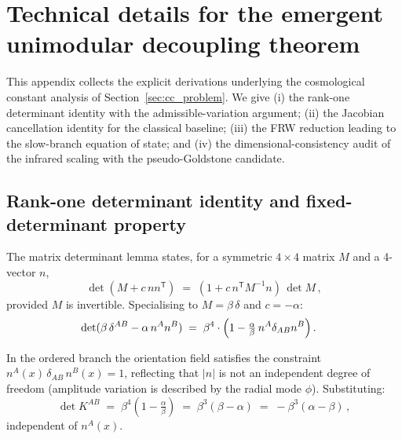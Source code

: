 
\section{Technical details for the emergent unimodular decoupling
theorem}
\label{app:cc_technical}

This appendix collects the explicit derivations underlying the
cosmological constant analysis of Section~\ref{sec:cc_problem}. We
give (i) the rank-one determinant identity with the admissible-variation
argument; (ii) the Jacobian cancellation identity for the classical
baseline; (iii) the FRW reduction leading to the slow-branch equation
of state; and (iv) the dimensional-consistency audit of the infrared
scaling with the pseudo-Goldstone candidate.


\subsection{Rank-one determinant identity and fixed-determinant
property}
\label{app:rank1}

The matrix determinant lemma states, for a symmetric $4\times 4$
matrix $M$ and a 4-vector $n$,
\begin{equation}
\det(M + c\,n n^{\mathsf T})
\;=\; (1 + c\,n^{\mathsf T} M^{-1} n)\,\det M\,,
\label{eq:matrix_det_lemma}
\end{equation}
provided $M$ is invertible. Specialising to $M = \beta\,\delta$ and
$c = -\alpha$:
\begin{align}
\det(\beta\,\delta^{AB} - \alpha\,n^A n^B)
&\;=\; \beta^4 \cdot \Bigl(1 - \tfrac{\alpha}{\beta}\,n^A
\delta_{AB} n^B\Bigr)\,.
\label{eq:K_det_general_app}
\end{align}

In the ordered branch the orientation field satisfies the
constraint $n^A(x)\,\delta_{AB}\,n^B(x) = 1$, reflecting that $|n|$
is not an independent degree of freedom (amplitude variation is
described by the radial mode $\phi$). Substituting:
\begin{equation}
\det K^{AB} \;=\; \beta^4\left(1 - \tfrac{\alpha}{\beta}\right)
\;=\; \beta^3(\beta - \alpha) \;=\; -\beta^3(\alpha - \beta)\,,
\label{eq:detK_app}
\end{equation}
independent of $n^A(x)$.

